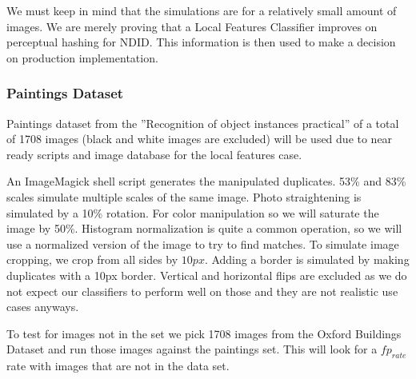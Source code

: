 \documentclass[english,12pt,a4paper,pdftex,elec,utf8, table]{aaltothesis}
\begin{document}
We must keep in mind that the simulations are for a relatively small amount of images. We are merely proving that a Local Features Classifier improves on perceptual hashing for NDID. This information is then used to make a decision on production implementation.

\subsubsection{Paintings Dataset}
Paintings dataset from the ''Recognition of object instances practical'' \cite{Vedaldi2012} of a total of 1708 images (black and white images are excluded) will be used due to near ready scripts and image database for the local features case.

An ImageMagick shell script generates the manipulated duplicates. 53\% and 83\% scales simulate multiple scales of the same image. Photo straightening is simulated by a 10\% rotation. For color manipulation so we will saturate the image by 50\%. Histogram normalization is quite a common operation, so we will use a normalized version of the image to try to find matches. To simulate image cropping, we crop from all sides by $10px$. Adding a border is simulated by making duplicates with a 10px border. Vertical and horizontal flips are excluded as we do not expect our classifiers to perform well on those and they are not realistic use cases anyways.

To test for images not in the set we pick 1708 images from the Oxford Buildings Dataset \cite{PhilbinJamesArandjelovicReljaZisserman2012} and run those images against the paintings set. This will look for a $fp_{rate}$ rate with images that are not in the data set.
\end{document}
